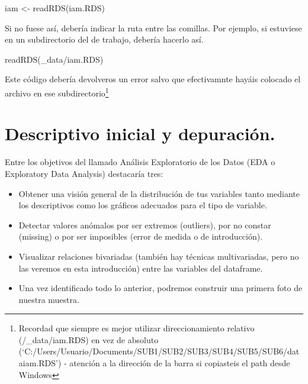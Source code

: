 \documentclass[
  letterpaper,
  DIV=11,
  numbers=noendperiod]{scrreprt}
\newenvironment{Shaded}{\begin{snugshade}}{\end{snugshade}}
\newcommand{\FunctionTok}[1]{\textcolor[rgb]{0.28,0.35,0.67}{#1}}
\newcommand{\NormalTok}[1]{\textcolor[rgb]{0.00,0.23,0.31}{#1}}
\newcommand{\OtherTok}[1]{\textcolor[rgb]{0.00,0.23,0.31}{#1}}
\newcommand{\StringTok}[1]{\textcolor[rgb]{0.13,0.47,0.30}{#1}}
\providecommand{\tightlist}{%
  \setlength{\itemsep}{0pt}\setlength{\parskip}{0pt}}\usepackage{longtable,booktabs,array}
\begin{document}
\begin{Shaded}
\begin{Highlighting}[]
\NormalTok{iam }\OtherTok{\textless{}{-}} \FunctionTok{readRDS}\NormalTok{(}\StringTok{\textquotesingle{}iam.RDS\textquotesingle{}}\NormalTok{)}
\end{Highlighting}
\end{Shaded}

Si no fuese así, debería indicar la ruta entre las comillas. Por
ejemplo, si estuviese en un subdirectorio del de trabajo, debería
hacerlo así.

\begin{Shaded}
\begin{Highlighting}[]
\FunctionTok{readRDS}\NormalTok{(}\StringTok{\textquotesingle{}\_data/iam.RDS\textquotesingle{}}\NormalTok{)}
\end{Highlighting}
\end{Shaded}

Este código debería devolveros un error salvo que efectivamnte hayáis
colocado el archivo en ese subdirectorio\footnote{Recordad que siempre
  es mejor utilizar direccionamiento relativo (/\_data/iam.RDS) en vez
  de absoluto
  (`C:/Users/Usuario/Documents/SUB1/SUB2/SUB3/SUB4/SUB5/SUB6/dataiam.RDS')
  - atención a la dirección de la barra si copiasteis el path desde
  Windows}

\hypertarget{descriptivo-inicial-y-depuraciuxf3n.}{%
\section{Descriptivo inicial y
depuración.}\label{descriptivo-inicial-y-depuraciuxf3n.}}

Entre los objetivos del llamado Análisis Exploratorio de los Datos (EDA
o Exploratory Data Analysis) destacaría tres:

\begin{itemize}
\tightlist
\item
  Obtener una visión general de la distribución de tus variables tanto
  mediante los descriptivos como los gráficos adecuados para el tipo de
  variable.
\item
  Detectar valores anómalos por ser extremos (outliers), por no constar
  (missing) o por ser imposibles (error de medida o de introducción).
\item
  Visualizar relaciones bivariadas (también hay técnicas multivariadas,
  pero no las veremos en esta introducción) entre las variables del
  dataframe.
\item
  Una vez identificado todo lo anterior, podremos construir una primera
  foto de nuestra muestra.
\end{itemize}
\end{document}
